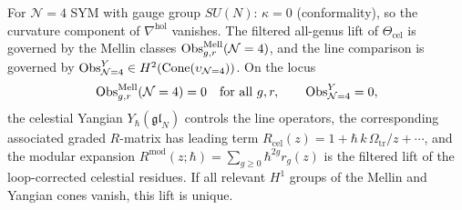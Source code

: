 \begin{proposition}[Celestial holographic datum for $\mathcal N=4$ SYM]
\label{prop:celestial-hmkd-n4-obstruction-locus}
For $\mathcal N=4$ SYM with gauge group $SU(N)$:
$\kappa=0$ (conformality), so the curvature component of
$\nabla^{\mathrm{hol}}$ vanishes. The filtered all-genus lift of
$\Theta_{\mathrm{cel}}$ is governed by the Mellin classes
$\operatorname{Obs}_{g,r}^{\mathrm{Mell}}(\mathcal N=4)$, and the line comparison is governed by
$\operatorname{Obs}_{\mathcal N=4}^{Y}\in H^2(\operatorname{Cone}(\upsilon_{\mathcal N=4}))$.
On the locus
\[
\operatorname{Obs}_{g,r}^{\mathrm{Mell}}(\mathcal N=4)=0\quad\text{for all }g,r,
\qquad
\operatorname{Obs}_{\mathcal N=4}^{Y}=0,
\]
the celestial Yangian $Y_\hbar(\mathfrak{gl}_N)$ controls the line operators, the
corresponding associated graded $R$-matrix has leading term
$R_{\mathrm{cel}}(z)=1+\hbar\,k\,\Omega_{\mathrm{tr}}/z+\cdots$, and the modular expansion
$R^{\mathrm{mod}}(z;\hbar)=\sum_{g\ge 0}\hbar^{2g}r_g(z)$ is the filtered lift of the
loop-corrected celestial residues. If all relevant $H^1$ groups of the Mellin and Yangian
cones vanish, this lift is unique.
\end{proposition}
